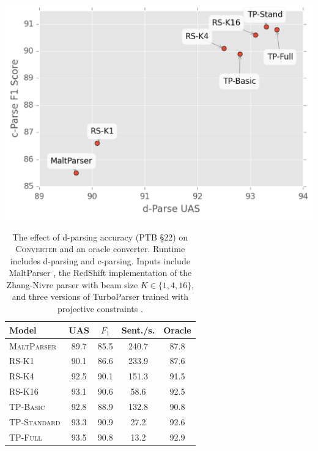 \documentclass[11pt,letterpaper]{article}
\newcommand{\ParseName}{\textsc{Converter}\xspace}
\begin{document}
\begin{table}
  \centering
  \small
  \includegraphics[scale=0.55]{../notebooks/parsers}
  \begin{tabular}{lcccc}
    \toprule
    Model & UAS  & $F_1$ & Sent./s.  & Oracle  \\
    \midrule

    \textsc{MaltParser}  & 89.7 & 85.5 & 240.7& 87.8 \\
    \textsc{RS-K1}       & 90.1 & 86.6 & 233.9& 87.6 \\
    \textsc{RS-K4}       & 92.5 & 90.1 & 151.3& 91.5 \\
    \textsc{RS-K16}      & 93.1 & 90.6 & 58.6 & 92.5 \\
    \textsc{TP-Basic}    & 92.8 & 88.9 & 132.8& 90.8 \\
    \textsc{TP-Standard} & 93.3 & 90.9 & 27.2 & 92.6 \\
    \textsc{TP-Full}     & 93.5 & 90.8 & 13.2 & 92.9 \\
    \bottomrule
  \end{tabular}


  
  \caption{The effect of d-parsing accuracy (PTB \S 22)
    on \ParseName{} and an oracle converter.  Runtime includes
    d-parsing and c-parsing.  
    Inputs include 
 MaltParser \cite{nivre2006maltparser}, 
    the RedShift implementation of the Zhang-Nivre parser
    \cite{zhang2011transition} with beam size $K \in \{1, 4, 16\}$,
and three versions of TurboParser trained with projective constraints
    \cite{martins2013turning}.
\label{tab:oracle} }
\end{table}
\end{document}
